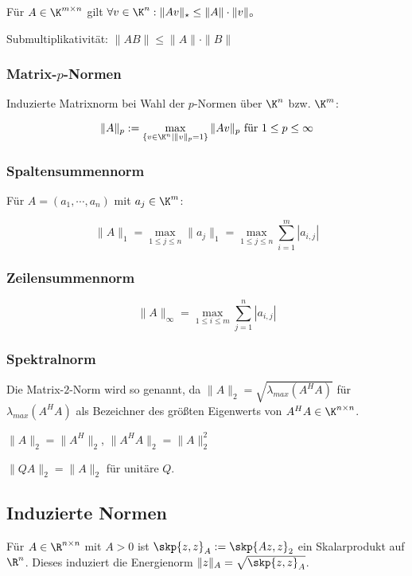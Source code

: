 Für $A \in \K^{m \times n}$ gilt $\forall v \in \K^n : \|Av\|_\star \leq \|A\| \cdot \|v\|_\circ$

Submultiplikativität: $\|AB\| \leq \|A\| \cdot \|B\|$

\subsubsection*{Matrix-$p$-Normen}

Induzierte Matrixnorm bei Wahl der $p$-Normen über $\K^n$ bzw. $\K^m$:

\vspace*{-4mm}
$$\|A\|_p := \max_{\{v \in \K^n | \|v\|_p = 1 \}} \|Av\|_p \text{ für } 1 \leq p \leq \infty$$

\subsubsection*{Spaltensummennorm}

Für $A = (a_1, \cdots, a_n)$ mit $a_j \in \K^m$:

\vspace*{-4mm}
$$\|A\|_1 = \max_{1 \leq j \leq n} \|a_j\|_1 = \max_{1 \leq j \leq n} \sum_{i=1}^m |a_{i,j}|$$

\subsubsection*{Zeilensummennorm}

\vspace*{-4mm}
$$\|A\|_\infty = \max_{1 \leq i \leq m} \sum_{j=1}^n |a_{i,j}|$$

\subsubsection*{Spektralnorm}

Die Matrix-$2$-Norm wird so genannt, da $\|A\|_2 = \sqrt{\lambda_{max}(A^H A)}$ für $\lambda_{max}(A^H A)$ als Bezeichner des größten Eigenwerts von $A^H A \in \K^{n \times n}$.

$\|A\|_2 = \|A^H\|_2$, $\|A^H A\|_2 = \|A\|_2^2$

$\|Q A\|_2 = \|A\|_2$ für unitäre $Q$.

\subsection*{Induzierte Normen}

Für $A \in \R^{n \times n}$ mit $A > 0$ ist $\skp{z,z}_A := \skp{Az,z}_2$ ein Skalarprodukt auf $\R^n$. Dieses induziert die Energienorm $\|z\|_A = \sqrt{\skp{z,z}_A}$.

